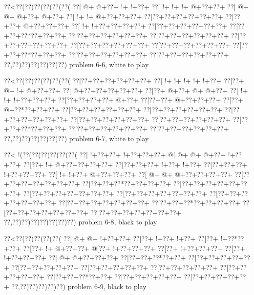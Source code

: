 \vbox{\vbox{\goo
\0??<\0??(\0??(\0??(\0??(\0??(\0??(
\0??[\- @+\- @+\0??+\- !+\- !+\0??+
\0??[\- !+\- !+\- !+\- @+\0??+\0??+
\0??[\- @+\- @+\- @+\0??+\- @+\0??+
\0??[\- !+\- !+\- @+\0??+\0??+\0??+
\0??[\0??+\0??+\0??+\0??+\0??+\0??+
\0??[\0??+\0??+\- @+\0??+\0??+\0??+
\0??[\- !+\- !+\0??+\0??+\0??+\0??+
\0??[\0??+\0??+\0??+\0??+\0??+\0??+
\0??[\0??+\0??+\0??*\0??+\0??+\0??+
\0??[\0??+\0??+\0??+\0??+\0??+\0??+
\0??[\0??+\0??+\0??+\0??+\0??+\0??+
\0??[\0??+\0??+\0??+\0??+\0??+\0??+
\0??[\0??+\0??+\0??+\0??+\0??+\0??+
\0??[\0??+\0??+\0??+\0??+\0??+\0??+
\0??[\0??+\0??+\0??*\0??+\0??+\0??+
\0??[\0??+\0??+\0??+\0??+\0??+\0??+
\0??[\0??+\0??+\0??+\0??+\0??+\0??+
\0??,\0??)\0??)\0??)\0??)\0??)\0??)
}
\hfil problem 6-6, white to play\hfil\break
}

\vbox{\vbox{\goo
\0??<\0??(\0??(\0??(\0??(\0??(\0??(
\0??[\0??+\0??+\0??+\0??+\0??+\0??+
\0??[\- !+\- !+\- !+\- !+\- !+\0??+
\0??[\0??+\- @+\- !+\- @+\0??+\0??+
\0??[\- @+\0??+\0??+\0??+\0??+\0??+
\0??[\0??+\- @+\0??+\- @+\- @+\0??+
\0??[\- !+\- !+\- !+\0??+\0??+\0??+
\0??[\0??+\0??+\0??+\0??+\- @+\0??+
\0??[\0??+\0??+\- @+\0??+\0??+\0??+
\0??[\0??+\- @+\0??*\0??+\0??+\0??+
\0??[\0??+\0??+\0??+\0??+\0??+\0??+
\0??[\0??+\0??+\0??+\0??+\0??+\0??+
\0??[\0??+\0??+\0??+\0??+\0??+\0??+
\0??[\0??+\0??+\0??+\0??+\0??+\0??+
\0??[\0??+\0??+\0??+\0??+\0??+\0??+
\0??[\0??+\0??+\0??*\0??+\0??+\0??+
\0??[\0??+\0??+\0??+\0??+\0??+\0??+
\0??[\0??+\0??+\0??+\0??+\0??+\0??+
\0??,\0??)\0??)\0??)\0??)\0??)\0??)
}
\hfil problem 6-7, white to play\hfil\break
}

\vbox{\vbox{\goo
\0??<\- !(\0??(\0??(\0??(\0??(\0??(\0??(
\0??[\- !+\0??+\0??+\- !+\0??+\0??+\0??+
\- @[\- @+\- @+\- @+\0??+\- !+\0??+\0??+
\0??[\0??+\- !+\- @+\0??+\0??+\0??+\0??+
\0??[\0??+\0??+\0??+\- !+\0??+\- !+\0??+
\0??[\0??+\0??+\0??+\- !+\0??+\0??+\0??+
\0??[\- !+\- !+\0??+\- @+\0??+\0??+\0??+
\0??[\- @+\- @+\- @+\0??+\0??+\0??+\0??+
\0??[\0??+\0??+\0??+\0??+\0??+\0??+\0??+
\0??[\0??+\0??+\0??*\0??+\0??+\0??+\0??+
\0??[\0??+\0??+\0??+\0??+\0??+\0??+\0??+
\0??[\0??+\0??+\0??+\0??+\0??+\0??+\0??+
\0??[\0??+\0??+\0??+\0??+\0??+\0??+\0??+
\0??[\0??+\0??+\0??+\0??+\0??+\0??+\0??+
\0??[\0??+\0??+\0??+\0??+\0??+\0??+\0??+
\0??[\0??+\0??+\0??*\0??+\0??+\0??+\0??+
\0??[\0??+\0??+\0??+\0??+\0??+\0??+\0??+
\0??[\0??+\0??+\0??+\0??+\0??+\0??+\0??+
\0??,\0??)\0??)\0??)\0??)\0??)\0??)\0??)
}
\hfil problem 6-8, black to play\hfil\break
}

\vbox{\vbox{\goo
\0??<\0??(\0??(\0??(\0??(\0??(
\0??[\- @+\- @+\- !+\0??+\0??+
\0??[\0??+\- !+\0??+\- !+\0??+
\0??[\0??+\- !+\0??*\0??+\0??+
\0??[\0??+\- !+\- @+\0??+\0??+
\- @[\0??+\- !+\0??+\0??+\0??+
\0??[\0??+\- !+\0??+\0??+\0??+
\0??[\0??+\- !+\0??+\0??+\0??+
\0??[\- @+\- @+\0??+\0??+\0??+
\0??[\0??+\0??+\0??*\0??+\0??+
\0??[\0??+\0??+\0??+\0??+\0??+
\0??[\0??+\0??+\0??+\0??+\0??+
\0??[\0??+\0??+\0??+\0??+\0??+
\0??[\0??+\0??+\0??+\0??+\0??+
\0??[\0??+\0??+\0??+\0??+\0??+
\0??[\0??+\0??+\0??*\0??+\0??+
\0??[\0??+\0??+\0??+\0??+\0??+
\0??[\0??+\0??+\0??+\0??+\0??+
\0??,\0??)\0??)\0??)\0??)\0??)
}
\hfil problem 6-9, black to play\hfil\break
}

